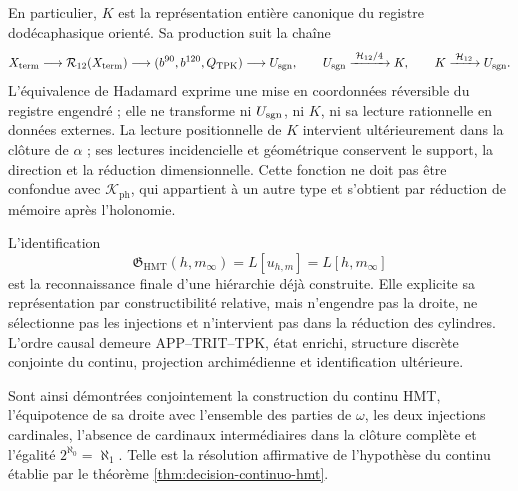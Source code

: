 En particulier, \(K\) est la représentation entière canonique du registre
dodécaphasique orienté. Sa production suit la chaîne
\[
 X_{\rm term}\longrightarrow\mathcal R_{12}(X_{\rm term})
 \longrightarrow(b^{90},b^{120},Q_{\rm TPK})
 \longrightarrow U_{\rm sgn},
 \qquad
 U_{\rm sgn}\xrightarrow{\;\mathcal H_{12}/4\;}K,
 \qquad
 K\xrightarrow{\;\mathcal H_{12}\;}U_{\rm sgn}.
\]
L’équivalence de Hadamard exprime une mise en coordonnées réversible du
registre engendré ; elle ne transforme ni \(U_{\rm sgn}\), ni \(K\), ni sa lecture
rationnelle en données externes. La lecture positionnelle de \(K\) intervient
ultérieurement dans la clôture de \(\alpha\) ; ses lectures incidencielle et
géométrique conservent le support, la direction et la réduction dimensionnelle. Cette fonction
ne doit pas être confondue avec \(\mathcal K_{\mathrm{ph}}\), qui appartient à un autre
type et s’obtient par réduction de mémoire après l’holonomie.

L’identification
\[
 \mathfrak G_{\mathrm{HMT}}(h,m_\infty)
 =L[u_{h,m}]=L[h,m_\infty]
\]
est la reconnaissance finale d’une hiérarchie déjà construite. Elle explicite sa
représentation par constructibilité relative, mais n’engendre pas la droite, ne
sélectionne pas les injections et n’intervient pas dans la réduction des cylindres.
L’ordre causal demeure APP--TRIT--TPK, état enrichi, structure discrète
conjointe du continu, projection archimédienne et identification ultérieure.

Sont ainsi démontrées conjointement la construction du continu HMT, l'équipotence de sa droite avec l'ensemble des parties de \(\omega\), les deux injections cardinales, l'absence de cardinaux intermédiaires dans la clôture complète et l'égalité \(2^{\aleph_0}=\aleph_1\). Telle est la résolution affirmative de l'hypothèse du continu établie par le théorème \ref{thm:decision-continuo-hmt}.

\endgroup
